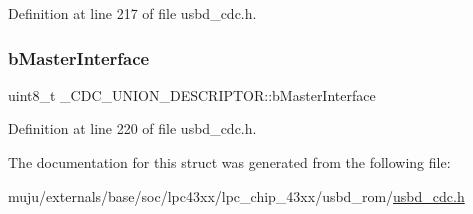 Definition at line 217 of file usbd\+\_\+cdc.\+h.

\mbox{\label{struct___c_d_c___u_n_i_o_n___d_e_s_c_r_i_p_t_o_r_aaa7e80367c520e1fc09a73f336df048e}} 
\subsubsection{\texorpdfstring{b\+Master\+Interface}{bMasterInterface}}
{\footnotesize\ttfamily uint8\+\_\+t \+\_\+\+C\+D\+C\+\_\+\+U\+N\+I\+O\+N\+\_\+\+D\+E\+S\+C\+R\+I\+P\+T\+O\+R\+::b\+Master\+Interface}



Definition at line 220 of file usbd\+\_\+cdc.\+h.



The documentation for this struct was generated from the following file\+:\begin{DoxyCompactItemize}
\item 
muju/externals/base/soc/lpc43xx/lpc\+\_\+chip\+\_\+43xx/usbd\+\_\+rom/\hyperlink{usbd__cdc_8h}{usbd\+\_\+cdc.\+h}\end{DoxyCompactItemize}
